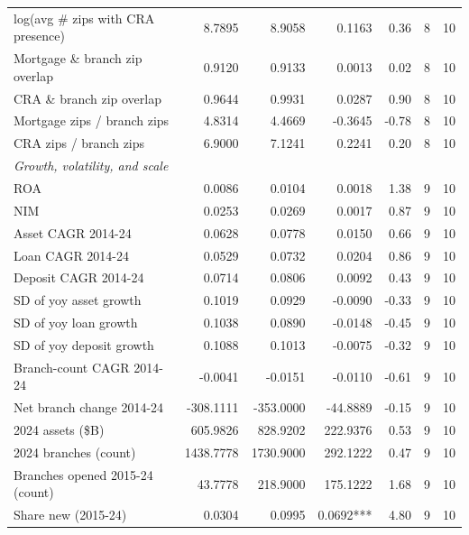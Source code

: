 \begin{tabular}{lrrrrrr}
log(avg \# zips with CRA presence) & 8.7895 & 8.9058 & 0.1163 & 0.36 & 8 & 10 \\
Mortgage \& branch zip overlap & 0.9120 & 0.9133 & 0.0013 & 0.02 & 8 & 10 \\
CRA \& branch zip overlap & 0.9644 & 0.9931 & 0.0287 & 0.90 & 8 & 10 \\
Mortgage zips / branch zips & 4.8314 & 4.4669 & -0.3645 & -0.78 & 8 & 10 \\
CRA zips / branch zips & 6.9000 & 7.1241 & 0.2241 & 0.20 & 8 & 10 \\
\midrule
\multicolumn{7}{l}{\emph{Growth, volatility, and scale}} \\
\midrule
ROA & 0.0086 & 0.0104 & 0.0018 & 1.38 & 9 & 10 \\
NIM & 0.0253 & 0.0269 & 0.0017 & 0.87 & 9 & 10 \\
Asset CAGR 2014-24 & 0.0628 & 0.0778 & 0.0150 & 0.66 & 9 & 10 \\
Loan CAGR 2014-24 & 0.0529 & 0.0732 & 0.0204 & 0.86 & 9 & 10 \\
Deposit CAGR 2014-24 & 0.0714 & 0.0806 & 0.0092 & 0.43 & 9 & 10 \\
SD of yoy asset growth & 0.1019 & 0.0929 & -0.0090 & -0.33 & 9 & 10 \\
SD of yoy loan growth & 0.1038 & 0.0890 & -0.0148 & -0.45 & 9 & 10 \\
SD of yoy deposit growth & 0.1088 & 0.1013 & -0.0075 & -0.32 & 9 & 10 \\
Branch-count CAGR 2014-24 & -0.0041 & -0.0151 & -0.0110 & -0.61 & 9 & 10 \\
Net branch change 2014-24 & -308.1111 & -353.0000 & -44.8889 & -0.15 & 9 & 10 \\
2024 assets (\$B) & 605.9826 & 828.9202 & 222.9376 & 0.53 & 9 & 10 \\
2024 branches (count) & 1438.7778 & 1730.9000 & 292.1222 & 0.47 & 9 & 10 \\
Branches opened 2015-24 (count) & 43.7778 & 218.9000 & 175.1222 & 1.68 & 9 & 10 \\
Share new (2015-24) & 0.0304 & 0.0995 & 0.0692*** & 4.80 & 9 & 10 \\
\bottomrule
\end{tabular}

